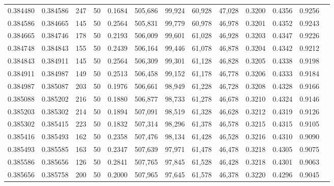 \begin{tabular}{rrrrrrrrrrrrr}
0.384480 & 0.384586 &   247 &  50 &                                     0.1684 & 505,686 &  99,924 &  60,928 &  47,028 & 0.3200 & 0.4356 & 0.9256 \\
0.384586 & 0.384665 &   145 &  50 &                                     0.2564 & 505,831 &  99,779 &  60,978 &  46,978 & 0.3201 & 0.4352 & 0.9243 \\
0.384665 & 0.384746 &   178 &  50 &                                     0.2193 & 506,009 &  99,601 &  61,028 &  46,928 & 0.3203 & 0.4347 & 0.9226 \\
0.384748 & 0.384843 &   155 &  50 &                                     0.2439 & 506,164 &  99,446 &  61,078 &  46,878 & 0.3204 & 0.4342 & 0.9212 \\
0.384843 & 0.384911 &   145 &  50 &                                     0.2564 & 506,309 &  99,301 &  61,128 &  46,828 & 0.3205 & 0.4338 & 0.9198 \\
0.384911 & 0.384987 &   149 &  50 &                                     0.2513 & 506,458 &  99,152 &  61,178 &  46,778 & 0.3206 & 0.4333 & 0.9184 \\
0.384987 & 0.385087 &   203 &  50 &                                     0.1976 & 506,661 &  98,949 &  61,228 &  46,728 & 0.3208 & 0.4328 & 0.9166 \\
0.385088 & 0.385202 &   216 &  50 &                                     0.1880 & 506,877 &  98,733 &  61,278 &  46,678 & 0.3210 & 0.4324 & 0.9146 \\
0.385203 & 0.385302 &   214 &  50 &                                     0.1894 & 507,091 &  98,519 &  61,328 &  46,628 & 0.3212 & 0.4319 & 0.9126 \\
0.385302 & 0.385415 &   223 &  50 &                                     0.1832 & 507,314 &  98,296 &  61,378 &  46,578 & 0.3215 & 0.4315 & 0.9105 \\
0.385416 & 0.385493 &   162 &  50 &                                     0.2358 & 507,476 &  98,134 &  61,428 &  46,528 & 0.3216 & 0.4310 & 0.9090 \\
0.385493 & 0.385585 &   163 &  50 &                                     0.2347 & 507,639 &  97,971 &  61,478 &  46,478 & 0.3218 & 0.4305 & 0.9075 \\
0.385586 & 0.385656 &   126 &  50 &                                     0.2841 & 507,765 &  97,845 &  61,528 &  46,428 & 0.3218 & 0.4301 & 0.9063 \\
0.385656 & 0.385758 &   200 &  50 &                                     0.2000 & 507,965 &  97,645 &  61,578 &  46,378 & 0.3220 & 0.4296 & 0.9045 \\

\end{tabular}
